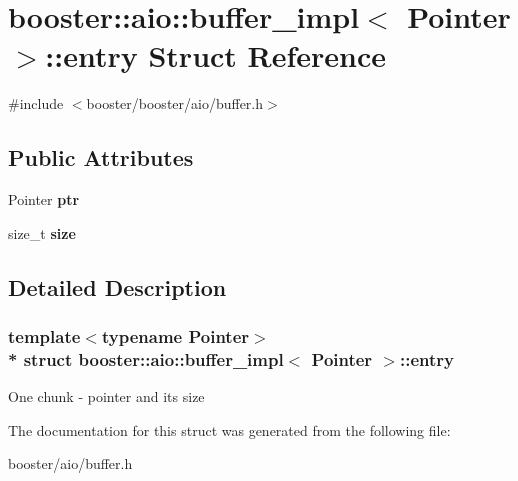 \section{booster\+:\+:aio\+:\+:buffer\+\_\+impl$<$ Pointer $>$\+:\+:entry Struct Reference}
\label{structbooster_1_1aio_1_1buffer__impl_1_1entry}


{\ttfamily \#include $<$booster/booster/aio/buffer.\+h$>$}

\subsection*{Public Attributes}
\begin{DoxyCompactItemize}
\item 
Pointer {\bfseries ptr}\label{structbooster_1_1aio_1_1buffer__impl_1_1entry_af3b07e6e32ee1a03bd14d5845474b08e}

\item 
size\+\_\+t {\bfseries size}\label{structbooster_1_1aio_1_1buffer__impl_1_1entry_ad9c755195e7ff64956f764defa4206ec}

\end{DoxyCompactItemize}


\subsection{Detailed Description}
\subsubsection*{template$<$typename Pointer$>$\\*
struct booster\+::aio\+::buffer\+\_\+impl$<$ Pointer $>$\+::entry}

One chunk -\/ pointer and its size 

The documentation for this struct was generated from the following file\+:\begin{DoxyCompactItemize}
\item 
booster/aio/buffer.\+h\end{DoxyCompactItemize}
